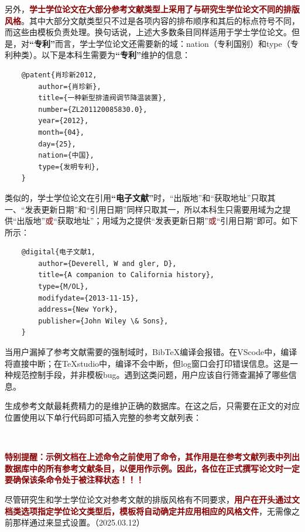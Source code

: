 \documentclass[print, doctor, vlined]{DissertUESTC}
\begin{document}
	另外，\textbf{\textcolor{DarkRed}{学士学位论文在大部分参考文献类型上采用了与研究生学位论文不同的排版风格}}。其中大部分文献类型只不过是各项内容的排布顺序和其后的标点符号不同，而这些由模板负责处理。换句话说，上述大多数条目同样适用于学士学位论文。但是，对\textbf{“专利”}而言，学士学位论文还需要新的域：nation（专利国别）和type（专利种类）。以下是本科生需要为\textbf{“专利”}维护的信息：
	\begin{verbatim}
	@patent{肖珍新2012,
	    author={肖珍新},
	    title={一种新型排渣阀调节降温装置},
	    number={ZL201120085830.0},
	    year={2012},
	    month={04},
	    day={25},
	    nation={中国},
	    type={发明专利},
	}
	\end{verbatim}
	类似的，学士学位论文在引用\textbf{“电子文献”}时，“出版地”和“获取地址”只取其一、“发表更新日期”和“引用日期”同样只取其一，所以本科生只需要用域为之提供“出版地”\textcolor{DarkRed}{或}“获取地址”；用域为之提供“发表更新日期”\textcolor{DarkRed}{或}“引用日期”即可。如下所示：
	\begin{verbatim}
	@digital{电子文献1,
	    author={Deverell, W and gler, D},
	    title={A companion to California history},
	    type={M/OL},
	    modifydate={2013-11-15},
	    address={New York},
	    publisher={John Wiley \& Sons},
	}
	\end{verbatim}

	

	当用户漏掉了参考文献需要的强制域时，BibTeX编译会报错。在VScode中，编译将直接中断；在TeXstudio中，编译不会中断，但log窗口会打印错误信息。这是一种规范控制手段，并非模板bug。遇到这类问题，用户应该自行筛查漏掉了哪些信息。
	
	生成参考文献最耗费精力的是维护正确的数据库。在这之后，只需要在正文的对应位置使用以下单行代码即可插入完整的参考文献列表：
	\begin{verbatim}
		
	\end{verbatim}
	
	\textbf{\textcolor{DarkRed}{特别提醒：示例文档在上述命令之前使用了命令，其作用是在参考文献列表中列出数据库中的所有参考文献条目，以便用作示例。因此，各位在正式撰写论文时一定要确保该条命令处于被注释状态！！！}}
	
	尽管研究生和学士学位论文对参考文献的排版风格有不同要求，\textbf{\textcolor{DarkRed}{用户在开头通过文档类选项指定学位论文类型后，模板将自动确定并应用相应的风格文件}}，无需像之前那样通过来显式设置。（2025.03.12）
	
\end{document}
